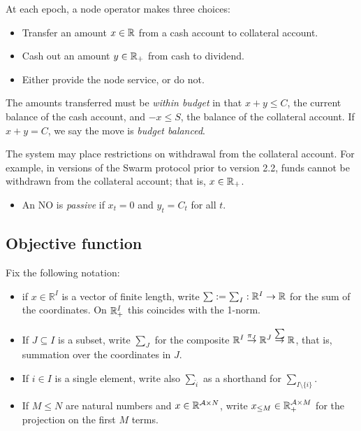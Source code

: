At each epoch, a node operator makes three choices:
%
\begin{itemize}
  \item Transfer an amount $x\in\mathbb{R}$ from a cash account to collateral account.
  \item Cash out an amount $y\in\mathbb{R}_+$ from cash to dividend.
  \item Either provide the node service, or do not.
\end{itemize}
%
The amounts transferred must be \emph{within budget} in that $x+y\leq C$, the current balance of the cash account, and $-x\leq S$, the balance of the collateral account.
%
If $x+y = C$, we say the move is \emph{budget balanced}.

The system may place restrictions on withdrawal from the collateral account.  For example, in versions of the Swarm protocol prior to version 2.2, funds cannot be withdrawn from the collateral account; that is, $x\in\mathbb{R}_+$.

\begin{itemize}
  \item An NO is \emph{passive} if $x_t=0$ and $y_t=C_t$ for all $t$.
\end{itemize}

\subsection{Objective function}

Fix the following notation:
\begin{itemize}
  \item if $x\in \mathbb{R}^I$ is a vector of finite length, write $\sum:=\sum_I:\mathbb{R}^I\rightarrow\mathbb{R}$ for the sum of the coordinates. On $\mathbb{R}_+^I$ this coincides with the 1-norm.
  \item If $J\subseteq I$ is a subset, write $\sum_J$ for the composite $\mathbb{R}^I\stackrel{\pi_J}{\rightarrow}\mathbb{R}^J\stackrel{\sum}{\rightarrow}\mathbb{R}$, that is, summation over the coordinates in $J$.
  \item If $i\in I$ is a single element, write also $\sum_{\hat{i}}$ as a shorthand for $\sum_{I\setminus\{i\}}$.
  \item If $M\leq N$ are natural numbers and $x\in\mathbb{R}^{\mathcal{A}\times N}$, write $x_{\leq M}\in \mathbb{R}_+^{\mathcal{A}\times M}$ for the projection on the first $M$ terms.
\end{itemize}

